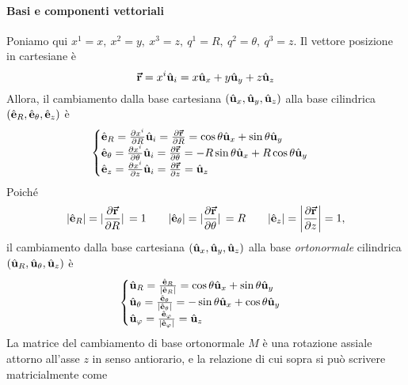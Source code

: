 \paragraph{Basi e componenti vettoriali}
Poniamo qui $x^1=x,\ x^2=y,\ x^3=z,\ q^1=R,\ q^2=\theta,\ q^3=z$.
Il vettore posizione in cartesiane è
\begin{equation*}
	\vb*{\va{r}}=x^i\hat{\mathbf{u}}_i=x\hat{\mathbf{u}}_x+y\hat{\mathbf{u}}_y+z\hat{\mathbf{u}}_z
\end{equation*}
Allora, il cambiamento dalla base cartesiana $\left(\hat{\mathbf{u}}_x,\hat{\mathbf{u}}_y,\hat{\mathbf{u}}_z\right)$ alla base cilindrica $\left(\hat{\mathbf{e}}_R,\hat{\mathbf{e}}_\theta,\hat{\mathbf{e}}_z\right)$ è
\begin{equation}
	\begin{cases}
		\hat{\mathbf{e}}_R=\pdv{x^i}{R}\hat{\mathbf{u}}_i=\pdv{\vb*{\va{r}}}{R}=\cos\theta\hat{\mathbf{u}}_x+\sin\theta\hat{\mathbf{u}}_y\\
		\hat{\mathbf{e}}_\theta=\pdv{x^i}{\theta}\hat{\mathbf{u}}_i=\pdv{\vb*{\va{r}}}{\theta}=-R\sin\theta\hat{\mathbf{u}}_x+R\cos\theta\hat{\mathbf{u}}_y\\
		\hat{\mathbf{e}}_z=\pdv{x^i}{z}\hat{\mathbf{u}}_i=\pdv{\vb*{\va{r}}}{z}=\hat{\mathbf{u}}_z
	\end{cases}
\end{equation}
Poiché
\begin{equation}
	\abs{\hat{\mathbf{e}}_R}=\abs*{\pdv{\vb*{\va{r}}}{R}}=1\qquad\abs{\hat{\mathbf{e}}_\theta}=\abs*{\pdv{\vb*{\va{r}}}{\theta}}=R\qquad\abs{\hat{\mathbf{e}}_z}=\abs{\pdv{\vb*{\va{r}}}{z}}=1,
\end{equation}
il cambiamento dalla base cartesiana $\left(\hat{\mathbf{u}}_x,\hat{\mathbf{u}}_y,\hat{\mathbf{u}}_z\right)$ alla base \textit{ortonormale} cilindrica $\left(\hat{\mathbf{u}}_R,\hat{\mathbf{u}}_\theta,\hat{\mathbf{u}}_z\right)$ è
\begin{equation}
	\begin{cases}
		\hat{\mathbf{u}}_R=\frac{\hat{\mathbf{e}}_R}{\abs{\hat{\mathbf{e}}_R}}=\cos\theta\hat{\mathbf{u}}_x+\sin\theta\hat{\mathbf{u}}_y\\
		\hat{\mathbf{u}}_\theta=\frac{\hat{\mathbf{e}}_\theta}{\abs{\hat{\mathbf{e}}_\theta}}=-\sin\theta\hat{\mathbf{u}}_x+\cos\theta\hat{\mathbf{u}}_y\\
		\hat{\mathbf{u}}_\varphi=\frac{\hat{\mathbf{e}}_\varphi}{\abs{\hat{\mathbf{e}}_\varphi}}=\hat{\mathbf{u}}_z
	\end{cases}
\end{equation}
La matrice del cambiamento di base ortonormale $M$ è una rotazione assiale attorno all'asse $z$ in senso antiorario, e la relazione di cui sopra si può scrivere matricialmente come
